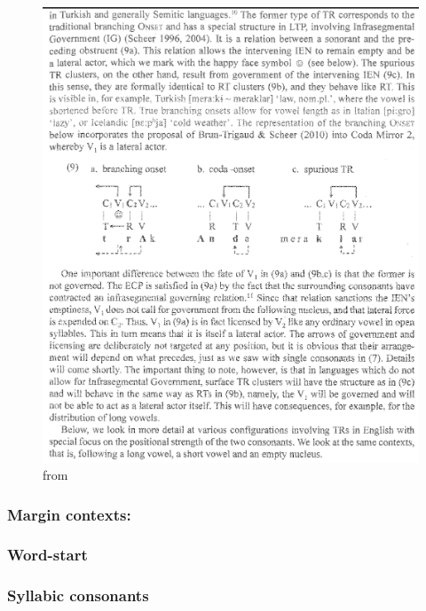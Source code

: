 \begin{figure}
  \includegraphics{figures/note_phon_objects_coda_ig.png}
  \caption{from \cite[p.~12]{scheerCyran2017}}
\end{figure}


\subsubsection{Margin contexts:}
\subsubsection{Word-start \ctx{\#\_}}\label{intro:obj:word start}
\begin{structure}{}
  \wordstart

\end{structure}
\TODO{}

\subsubsection{Syllabic consonants}
\TODO{}

